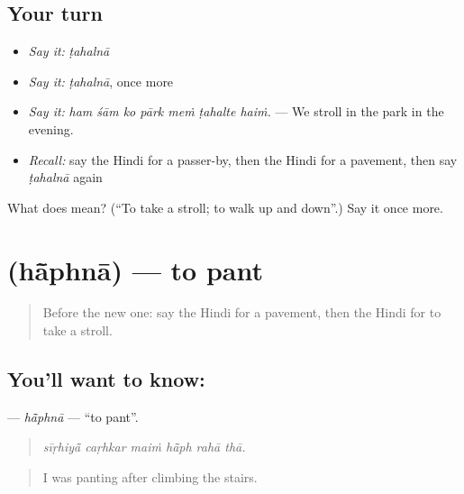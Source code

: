 \subsection*{Your turn}
\begin{itemize}
\raggedright
  \item \emph{Say it:} \emph{ṭahalnā}
  \item \emph{Say it:} \emph{ṭahalnā}, once more
  \item \emph{Say it:} \emph{ham śām ko pārk meṁ ṭahalte haiṁ.} — We stroll in the park in the evening.
  \item \emph{Recall:} say the Hindi for a passer-by, then the Hindi for a pavement, then say \emph{ṭahalnā} again
\end{itemize}

\begin{tcolorbox}[breakable,colback=teal!4,colframe=teal!35!black,title={Before you move on}]
What does  mean? (\textquotedblleft{}To take a stroll; to walk up and down\textquotedblright{}.) Say it once more.
\end{tcolorbox}
\section[\texorpdfstring{\hi{हाँफना} (hā̃phnā)}{हाँफना (hā̃phnā)}]{ (hā̃phnā) — to pant}

\label{lesson:HI-C403-haphna}



\begin{quote}
Before the new one: say the Hindi for a pavement, then the Hindi for to take a stroll.
\end{quote}

\subsection*{You'll want to know: }
\textbf{} — \emph{hā̃phnā} — \textquotedblleft{}to pant\textquotedblright{}.

\begin{quote}
     
\end{quote}

\begin{quote}
\emph{sīṛhiyā̃ caṛhkar maiṁ hā̃ph rahā thā.}
\end{quote}

\begin{quote}
I was panting after climbing the stairs.
\end{quote}

